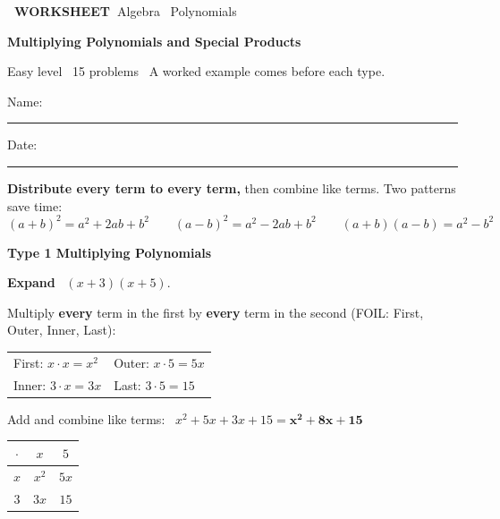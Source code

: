 \documentclass[11pt,letterpaper]{article}
\newcommand{\badge}[1]{\colorbox{fmtitle}{\color{white}\bfseries\small\ #1\ }}
\newcommand{\topicbar}[1]{\needspace{4.5cm}\par\vspace{5mm}
  \begin{tcolorbox}[enhanced,colback=fmtitle,colframe=fmtitle,arc=2mm,left=4mm,top=1.5mm,bottom=1.5mm]
  \color{white}\bfseries\large #1
  \end{tcolorbox}}
\begin{document}
\badge{WORKSHEET}\hfill{\small\color{fmgray}Algebra \textperiodcentered\ Polynomials}\par\vspace{4mm}
{\color{fmtitle}\LARGE\bfseries Multiplying Polynomials and Special Products}\par\vspace{1mm}
{\color{fmgray}Easy level \textperiodcentered\ 15 problems \textperiodcentered\ A worked example comes before each type.}\par\vspace{3mm}
Name: \rule{6cm}{0.4pt}\hspace{1cm}Date: \rule{3.5cm}{0.4pt}\par
\begin{keyidea}
\textbf{Distribute every term to every term,} then combine like terms. Two patterns save time:
\[ (a + b)^2 = a^2 + 2ab + b^2 \qquad (a - b)^2 = a^2 - 2ab + b^2 \qquad (a + b)(a - b) = a^2 - b^2 \]
\end{keyidea}
\needspace{9cm}\topicbar{Type 1 \quad Multiplying Polynomials}
\begin{watchme}\begin{minipage}{0.64\linewidth}
\textbf{Expand} \ $(x + 3)(x + 5)$.\par\vspace{1mm}
Multiply \textbf{every} term in the first by \textbf{every} term in the second (FOIL: First, Outer, Inner, Last):\par\vspace{1mm}
\renewcommand{\arraystretch}{1.4}\begin{tabular}{@{}l l@{}}
First: $x\cdot x = x^2$ & Outer: $x\cdot 5 = 5x$\\
Inner: $3\cdot x = 3x$ & Last: $3\cdot 5 = 15$
\end{tabular}\par\vspace{1mm}
Add and combine like terms: \ $x^2 + 5x + 3x + 15 = \boldsymbol{x^2 + 8x + 15}$
\end{minipage}\hfill\begin{minipage}{0.32\linewidth}\centering
\renewcommand{\arraystretch}{1.6}
\begin{tabular}{c|c|c}
$\cdot$ & $x$ & $5$\\\hline
$x$ & \cellcolor{fmkey!15}$x^2$ & \cellcolor{fmturn!20}$5x$\\\hline
$3$ & \cellcolor{fmturn!20}$3x$ & \cellcolor{fmwatch!20}$15$
\end{tabular}\par{}
\end{minipage}\end{watchme}
\end{document}
